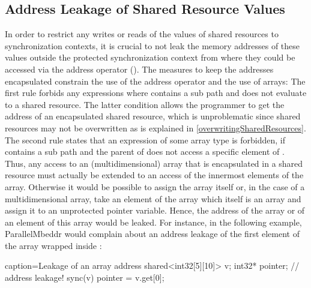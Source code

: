 \subsection{Address Leakage of Shared Resource Values}
In order to restrict any writes or reads of the values of shared resources to synchronization contexts, it is crucial to not leak the memory addresses of these values outside the protected synchronization context from where they could be accessed via the address operator (\CODE{\&}). The measures to keep the addresses encapsulated constrain the use of the address operator and the use of arrays: The first rule forbids any expressions  where  contains a sub path  and  does not evaluate to a shared resource. The latter condition allows the programmer to get the address of an encapsulated shared resource, which is unproblematic since shared resources may not be overwritten as is explained in \ref{overwritingSharedResources}. The second rule states that an expression  of some array type is forbidden, if  contains a sub path  and the parent of  does not access a specific element of . Thus, any access to an (multidimensional) array that is encapsulated in a shared resource must actually be extended to an access of the innermost elements of the array. Otherwise it would be possible to assign the array itself or, in the case of a multidimensional array, take an element of the array which itself is an array and assign it to an unprotected pointer variable. Hence, the address of the array or of an element of this array would be leaked. For instance, in the following example, ParallelMbeddr would complain about an address leakage of the first element of the array wrapped inside :
\begin{ccode}{caption=Leakage of an array address}
shared<int32[5][10]> v;
int32* pointer;
// address leakage!
sync(v) { pointer = v.get[0]; }
\end{ccode}

